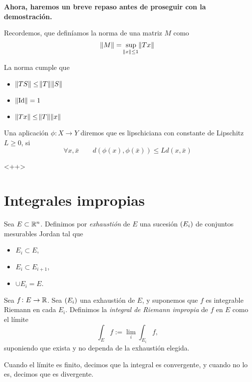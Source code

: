 \textbf{Ahora, haremos un breve repaso antes de proseguir con la demostración.}

\begin{defi*}
    Recordemos, que definíamos la norma de una matriz $M$ como
    \[
        \norm{M} = \sup_{\norm{x} \leq 1} \norm{T x}
    \]
\end{defi*}

\begin{prop*}
    La norma cumple que
    \begin{itemize}
        \item $\norm{TS} \leq \norm{T}\norm{S}$
        \item $\norm{\operatorname{Id}} = 1$
        \item $\norm{Tx} \leq \norm{T} \norm{x}$
    \end{itemize}
\end{prop*}

\begin{defi*}
    Una aplicación $\phi \colon X \to Y$ diremos que es lipschiciana con constante de Lipschitz $L \geq 0$, si
    \[
        \forall x, \bar{x} \qquad
        d\left( \phi(x), \phi\left( \bar{x} \right) \right) \leq L d\left( x, \bar{x} \right)
    \]
\end{defi*}<++>

\section{Integrales impropias}

\begin{defi}
    Sea $E \subset \mathbb{R}^n$. Definimos por \textit{exhaustión} de $E$ una sucesión $\left( E_i \right)$ de conjuntos mesurables Jordan tal que
    \begin{itemize}
        \item $E_i \subset E$,
        \item $E_i \subset E_{i+1}$,
        \item $\cup E_i = E$.
    \end{itemize}
\end{defi}

\begin{defi}
    Sea $f \colon E \to \mathbb{R}$. Sea $\left( E_i \right)$ una exhaustión de $E$, y suponemos que $f$ es integrable Riemann en cada $E_i$. Definimos la \textit{integral de Riemann impropia} de $f$ en $E$ como el límite
    \[
        \int_E f := \lim_i \int_{E_i} f,
    \]
    suponiendo que exista y no dependa de la exhaustión elegida.
    
    Cuando el límite es finito, decimos que la integral es convergente, y cuando no lo es, decimos que es divergente.
\end{defi}

